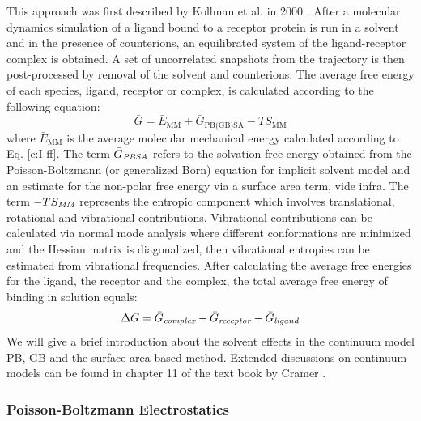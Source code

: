 \documentclass[11pt]{report}
\begin{document}
This approach was first described by Kollman et al. in 2000 \cite{Kollman2000}.
After a molecular dynamics simulation of a ligand bound to 
a receptor protein is run in a solvent and in the presence of counterions, an equilibrated system of the ligand-receptor complex is obtained. 
A set of uncorrelated snapshots from the trajectory is then post-processed by removal of the solvent and counterions. The average free energy of each species, ligand, receptor or complex, is calculated according to the following equation:
\begin{equation}
\label{eq:VS-G}
\bar{G} = \bar{E}_{\text{MM}} + \bar{G}_{\text{PB(GB)SA}} - TS_{\text{MM}}
\end{equation}
where $\bar{E}_{\text{MM}}$ is the average molecular mechanical energy calculated according to Eq. \ref{e:I-ff}.
The term $\bar{G}_{\emph{PBSA}}$ refers to the solvation free energy obtained from the Poisson-Boltzmann (or generalized Born) equation for implicit solvent model and an estimate for the non-polar free energy via a surface area term,
vide infra. The
term $-TS_{\emph{MM}}$ represents the entropic component which involves translational, rotational and vibrational contributions. Vibrational contributions can be calculated via normal mode analysis where different conformations are minimized and the Hessian matrix is diagonalized, then vibrational entropies can be estimated from vibrational frequencies. After calculating the average free energies for the ligand, the receptor and the complex, the total average free energy of binding in solution equals:
\begin{equation}
\label{eq:VS-dG}
  \Delta{G} = \bar{G}_{\emph{complex}} - \bar{G}_{\emph{receptor}} - \bar{G}_{\emph{ligand}}
\end{equation}
We will give a brief introduction about the solvent effects
in the continuum model PB, GB and the surface area based method.
Extended discussions on continuum models can be found in chapter 11
of the text book by Cramer \cite{Cramer2004}.

\subsubsection{Poisson-Boltzmann Electrostatics}
\end{document}

